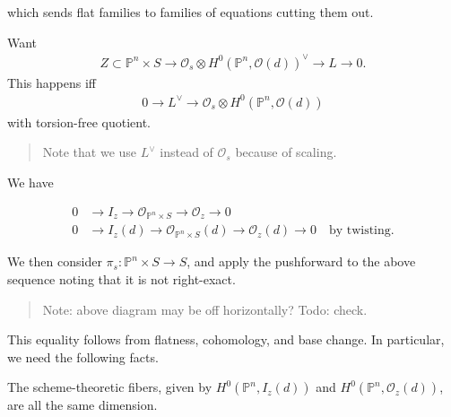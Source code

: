 which sends flat families to families of equations cutting them out.

Want
\begin{align*}
Z \subset {\mathbb{P}}^n \times S \to {\mathcal{O}}_s \otimes H^0( {\mathbb{P}}^n, {\mathcal{O}}(d) )^\vee\to L \to 0
.\end{align*}
This happens iff
\begin{align*}
0 \to L^\vee\to {\mathcal{O}}_s \otimes H^0({\mathbb{P}}^n, {\mathcal{O}}(d))
\end{align*}
with torsion-free quotient.

\begin{quote}
Note that we use \(L^\vee\) instead of \({\mathcal{O}}_s\) because of
scaling.
\end{quote}

We have

\begin{align*} 0 &\to I_z \to {\mathcal{O}}_{{\mathbb{P}}^n \times S} \to {\mathcal{O}}_z \to 0 \\ 0 &\to I_z(d) \to {\mathcal{O}}_{{\mathbb{P}}^n \times S}(d) \to {\mathcal{O}}_z(d) \to 0 \quad\text{by twisting} .\end{align*}

We then consider \(\pi_s: {\mathbb{P}}^n \times S \to S\), and apply the
pushforward to the above sequence noting that it is not right-exact.

\begin{center}
\end{center}

\begin{quote}
Note: above diagram may be off horizontally? Todo: check.
\end{quote}

This equality follows from flatness, cohomology, and base change. In
particular, we need the following facts.

The scheme-theoretic fibers, given by \(H^0({\mathbb{P}}^n, I_z(d))\)
and \(H^0({\mathbb{P}}^n, {\mathcal{O}}_z(d))\), are all the same
dimension.

